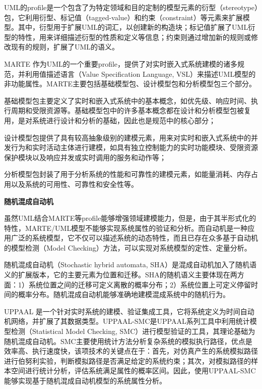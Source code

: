 	UML的profile是一个包含了为特定领域和目的定制的模型元素的衍型（stereotype）包，它利用衍型、标记值（tagged-value）和约束（constraint）等元素来扩展模型。其中，衍型用于扩展UML的词汇，以创建新的构造块；标记值扩展了UML衍型的特性，用来详细描述衍型的性质和定义等信息；约束则通过增加新的规则或修改现有的规则，扩展了UML的语义。

	MARTE\citep{DBLP:conf/icteri/Mallet13, DBLP:conf/ACISicis/LouatiBDS12} 作为UML的一个重要profile，提供了对实时嵌入式系统建模的诸多规范，并利用值描述语言（Value Specification Language, VSL）来描述UML模型的非功能属性。MARTE主要包括基础模型包、设计模型包和分析模型包三个部分。

	基础模型包主要定义了实时和嵌入式系统中的基本概念，如优先级、响应时间、执行周期和受限资源等。基础模型包中的许多基本概念都在设计和分析模型包被复用，是对系统进行设计和分析的基础，因此也是规范中的核心部分；

	设计模型包提供了具有较高抽象级别的建模元素，用来对实时和嵌入式系统中的并发行为和实时活动主体进行建模，如具有独立控制能力的实时功能模块、受限资源保护模块以及响应并发或实时调用的服务和动作等；

	分析模型包封装了用于分析系统的性能和可靠性的建模元素，如能量消耗、内存占用以及系统的可用性、可靠性和安全性等。
	
\textbf{随机混成自动机}

	虽然UML结合MARTE等profile能够增强领域建模能力，但是，由于其半形式化的特性，MARTE/UML模型不能够实现系统属性的验证和分析。而自动机是一种应用广泛的系统模型，它不仅可以描述系统的动态特性，而且已存在众多基于自动机的模型检测（Model Checking）\citep{Clarke1997Model}方法，可以实现对系统模型的定性、定量分析。
	
	随机混成自动机\citep{Hu2000Towards,David2011Statistical,程贝2016基于抽象和学习的统计模型检测研究}（Stochastic hybrid automata, SHA）是混成自动机加入了随机语义的扩展版本，它的主要元素为位置和迁移。SHA的随机语义主要体现在两方面：1）系统位置之间的迁移可定义离散的概率分布；2）系统位置上可定义停留时间的概率分布。随机混成自动机能够准确地建模混成系统中的随机行为。
	
	UPPAAL\citep{DBLP:journals/spe/BehrmannDLPY11} 是一个针对实时系统的建模、验证集成工具，它将系统定义为时间自动机网络，并扩展了其数据类型。UPPAAL-SMC\citep{DBLP:journals/spe/BehrmannDLPY11,DBLP:journals/corr/abs-1207-1272}是UPPAAL系列工具中利用统计模型检测（Statistical Model Checking, SMC）进行模型验证的工具，其理论基础为随机混成自动机。SMC主要使用统计方法分析复杂系统的模拟执行路径，优点是效率高、执行速度快，该项技术的关键点在于：首先，对仿真产生的系统模拟路径进行伯努利实验，判断模拟路径是否满足给定的系统约束；其次，对模拟路径的样本空间进行统计分析，评估系统满足属性的概率区间。因此，使用UPPAAL-SMC能够实现基于随机混成自动机模型的系统属性分析。

